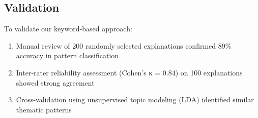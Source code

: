\subsection{Validation}
To validate our keyword-based approach:
\begin{enumerate}
\item Manual review of 200 randomly selected explanations confirmed 89\% accuracy in pattern classification
\item Inter-rater reliability assessment (Cohen's κ = 0.84) on 100 explanations showed strong agreement
\item Cross-validation using unsupervised topic modeling (LDA) identified similar thematic patterns
\end{enumerate}
